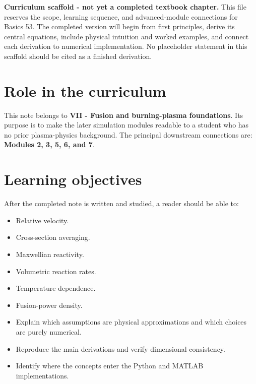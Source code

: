 \documentclass[11pt]{article}
\begin{document}

\begin{overviewbox}
\textbf{Curriculum scaffold - not yet a completed textbook chapter.} This file reserves the scope, learning sequence, and advanced-module connections for Basics 53. The completed version will begin from first principles, derive its central equations, include physical intuition and worked examples, and connect each derivation to numerical implementation. No placeholder statement in this scaffold should be cited as a finished derivation.
\end{overviewbox}

\ProjectTOC

\section{Role in the curriculum}
This note belongs to \textbf{VII - Fusion and burning-plasma foundations}. Its purpose is to make the later simulation modules readable to a student who has no prior plasma-physics background. The principal downstream connections are: \textbf{Modules 2, 3, 5, 6, and 7}.

\section{Learning objectives}
After the completed note is written and studied, a reader should be able to:
\begin{itemize}[leftmargin=1.6em]
\item Relative velocity.
\item Cross-section averaging.
\item Maxwellian reactivity.
\item Volumetric reaction rates.
\item Temperature dependence.
\item Fusion-power density.
\item Explain which assumptions are physical approximations and which choices are purely numerical.
\item Reproduce the main derivations and verify dimensional consistency.
\item Identify where the concepts enter the Python and MATLAB implementations.
\end{itemize}
\end{document}
